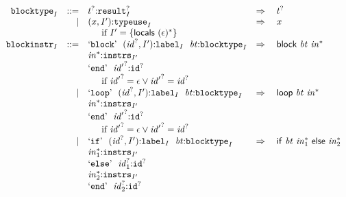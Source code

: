 $$
\begin{array}[t]{@{}lrrl@{}l@{}l@{}l@{}}
& {{\mathtt{blocktype}}}_{I} & ::= & {t^?}{:}{{{\mathtt{result}}}_{I}^?} & \quad\Rightarrow\quad{} & {t^?} \\
& & | & (x, {I'}){:}{{\mathtt{typeuse}}}_{I} & \quad\Rightarrow\quad{} & x &  \\
&&& \multicolumn{4}{@{}l@{}}{\quad
\quad \mbox{if}~ {I'} = \{ \mathsf{locals}~{(\epsilon)^\ast} \}
} \\
& {{\mathtt{blockinstr}}}_{I} & ::= & \begin{array}[t]{@{}l@{}} \mbox{‘\texttt{block}’}~~({{\mathit{id}}^?}, {I'}){:}{{\mathtt{label}}}_{I}~~{\mathit{bt}}{:}{{\mathtt{blocktype}}}_{I} \\
  {{\mathit{in}}^\ast}{:}{{\mathtt{instrs}}}_{{I'}} \\
  \mbox{‘\texttt{end}’}~~{{\mathit{id}'}^?}{:}{{\mathtt{id}}^?} \end{array} & \quad\Rightarrow\quad{} & \mathsf{block}~{\mathit{bt}}~{{\mathit{in}}^\ast} &  \\
&&& \multicolumn{4}{@{}l@{}}{\quad
\quad \mbox{if}~ {{\mathit{id}'}^?} = \epsilon \lor {{\mathit{id}'}^?} = {{\mathit{id}}^?}
} \\
& & | & \begin{array}[t]{@{}l@{}} \mbox{‘\texttt{loop}’}~~({{\mathit{id}}^?}, {I'}){:}{{\mathtt{label}}}_{I}~~{\mathit{bt}}{:}{{\mathtt{blocktype}}}_{I} \\
  {{\mathit{in}}^\ast}{:}{{\mathtt{instrs}}}_{{I'}} \\
  \mbox{‘\texttt{end}’}~~{{\mathit{id}'}^?}{:}{{\mathtt{id}}^?} \end{array} & \quad\Rightarrow\quad{} & \mathsf{loop}~{\mathit{bt}}~{{\mathit{in}}^\ast} &  \\
&&& \multicolumn{4}{@{}l@{}}{\quad
\quad \mbox{if}~ {{\mathit{id}'}^?} = \epsilon \lor {{\mathit{id}'}^?} = {{\mathit{id}}^?}
} \\
& & | & \begin{array}[t]{@{}l@{}} \mbox{‘\texttt{if}’}~~({{\mathit{id}}^?}, {I'}){:}{{\mathtt{label}}}_{I}~~{\mathit{bt}}{:}{{\mathtt{blocktype}}}_{I} \\
  {{\mathit{in}}_1^\ast}{:}{{\mathtt{instrs}}}_{{I'}} \\
  \mbox{‘\texttt{else}’}~~{{\mathit{id}}_1^?}{:}{{\mathtt{id}}^?} \\
  {{\mathit{in}}_2^\ast}{:}{{\mathtt{instrs}}}_{{I'}} \\
  \mbox{‘\texttt{end}’}~~{{\mathit{id}}_2^?}{:}{{\mathtt{id}}^?} \end{array} & \quad\Rightarrow\quad{} & \mathsf{if}~{\mathit{bt}}~{{\mathit{in}}_1^\ast}~\mathsf{else}~{{\mathit{in}}_2^\ast} &  \\

\end{array}$$
